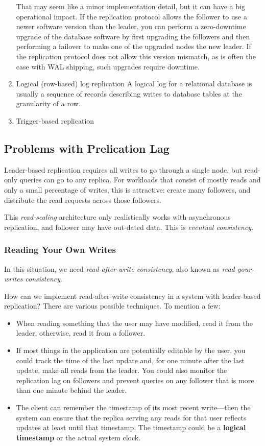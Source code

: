 \documentclass[11pt]{article}
\begin{document}
\begin{enumerate}
That may seem like a minor implementation detail, but it can have a big operational
impact. If the replication protocol allows the follower to use a newer software version
than the leader, you can perform a zero-downtime upgrade of the database software
by first upgrading the followers and then performing a failover to make one of the
upgraded nodes the new leader. If the replication protocol does not allow this version
mismatch, as is often the case with WAL shipping, such upgrades require downtime.
\item Logical (row-based) log replication
\label{sec:org621d0b4}
A logical log for a relational database is usually a sequence of records describing
writes to database tables at the granularity of a row.
\item Trigger-based replication
\label{sec:orgaa33f74}
\end{enumerate}
\subsection{Problems with Prelication Lag}
\label{sec:org674e4fb}
Leader-based replication requires all writes to go through a single node, but read-only queries
can go to any replica. For workloads that consist of mostly reads and only a small percentage of
writes, this is attractive: create many followers, and distribute the read requests across those
followers.

This \emph{read-scaling} architecture only realistically works with asynchronous replication, and
follower may have out-dated data. This is \emph{eventual consistency}.
\subsubsection{Reading Your Own Writes}
\label{sec:orgbf5bc0e}
In this situation, we need \emph{read-after-write consistency}, also known as \emph{read-your-writes
consistency}.

How can we implement read-after-write consistency in a system with leader-based
replication? There are various possible techniques. To mention a few:
\begin{itemize}
\item When reading something that the user may have modified, read it from the leader; otherwise,
read it from a follower.
\item If most things in the application are potentially editable by the user, you could track the
time of the last update and, for one minute after the last update, make all reads from the
leader. You could also monitor the replication lag on followers and prevent queries on any
follower that is more than one minute behind the leader.
\item The client can remember the timestamp of its most recent write—then the system can ensure
that the replica serving any reads for that user reflects updates at least until that
timestamp. The timestamp could be a \textbf{logical timestamp} or the actual system clock.
\end{itemize}
\end{document}
